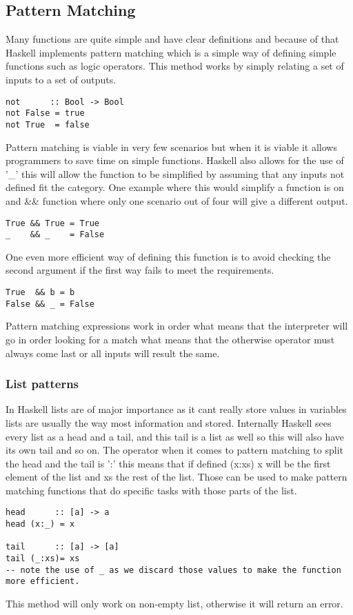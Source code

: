 \documentclass[12pt, oneside]{article}
\begin{document}
\subsection{Pattern Matching}
Many functions are quite simple and have clear definitions and because of that Haskell implements pattern matching which is a simple way of defining simple functions such as logic operators. This method works by simply relating a set of inputs to a set of outputs.
\begin{lstlisting}
not      :: Bool -> Bool
not False = true
not True  = false
\end{lstlisting}
Pattern matching is viable in very few scenarios but when it is viable it allows programmers to save time on simple functions. Haskell also allows for the use of '\_' this will allow the function to be simplified by assuming that any inputs not defined fit the category. One example where this would simplify a function is on and \&\& function where only one scenario out of four will give a different output.
\begin{lstlisting}
True && True = True
_    && _    = False
\end{lstlisting}
One even more efficient way of defining this function is to avoid checking the second argument if the first way fails to meet the requirements.
\begin{lstlisting}
True  && b = b
False && _ = False
\end{lstlisting}
Pattern matching expressions work in order what means that the interpreter will go in order looking for a match what means that the otherwise operator must always come last or all inputs will result the same.
\subsubsection{List patterns}
In Haskell lists are of major importance as it cant really store values in variables lists are usually the way most information and stored. Internally Haskell sees every list as a head and a tail, and this tail is a list as well so this will also have its own tail and so on. The operator when it comes to pattern matching to split the head and the tail is ':' this means that if defined (x:xs) x will be the first element of the list and xs the rest of the list.
Those can be used to make pattern matching functions that do specific tasks with those parts of the list.
\begin{lstlisting}
head      :: [a] -> a
head (x:_) = x

tail      :: [a] -> [a]
tail (_:xs)= xs
-- note the use of _ as we discard those values to make the function more efficient.
\end{lstlisting}
This method will only work on non-empty list, otherwise it will return an error.
\end{document}
